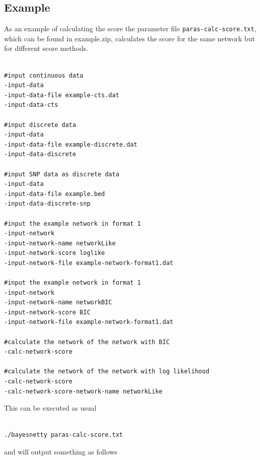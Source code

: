 \documentclass[a4paper,12pt]{article}
\newcommand{\code}[1]{{\footnotesize{{\tt #1}}}}
\begin{document}
\subsection{Example}
\label{calc-score-example}

As an example of calculating the score the parameter file \code{paras-calc-score.txt}, which can be found in example.zip, calculates the score for the same network but for different score methods. 
\vspace{0.35cm} \begin{lstlisting}

#input continuous data
-input-data
-input-data-file example-cts.dat
-input-data-cts

#input discrete data
-input-data
-input-data-file example-discrete.dat
-input-data-discrete

#input SNP data as discrete data
-input-data
-input-data-file example.bed
-input-data-discrete-snp

#input the example network in format 1
-input-network
-input-network-name networkLike
-input-network-score loglike
-input-network-file example-network-format1.dat

#input the example network in format 1
-input-network
-input-network-name networkBIC
-input-network-score BIC
-input-network-file example-network-format1.dat

#calculate the network of the network with BIC
-calc-network-score

#calculate the network of the network with log likelihood
-calc-network-score
-calc-network-score-network-name networkLike

\end{lstlisting} \vspace{0.35cm}
This can be executed as usual 
\vspace{0.35cm} \begin{lstlisting}

./bayesnetty paras-calc-score.txt

\end{lstlisting} \vspace{0.35cm}
and will output something as follows 
\end{document}
